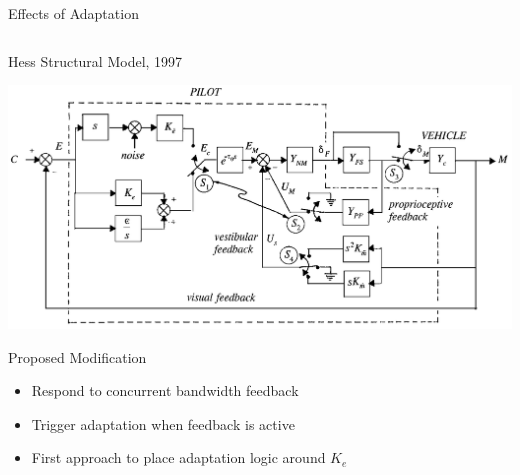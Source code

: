 \documentclass[10pt]{beamer}
\begin{document}
\begin{frame}[fragile]{Effects of Adaptation}
\begin{columns}[T]
\begin{column}{\textwidth}
    \end{column}
  \end{columns}
\end{frame}

\begin{frame}[fragile]{Hess Structural Model, 1997~\cite{Hess1997}}
  \begin{center}
    \includegraphics[width=\linewidth]{../img/Screen_Shot_2018-07-31_at_11.21.44_AM.png}
  \end{center}
\end{frame}

\begin{frame}[fragile]{Proposed Modification}
  \begin{itemize}
    \setlength\itemsep{1em}
    \item Respond to concurrent bandwidth feedback
    \item Trigger adaptation when feedback is active
    \item First approach to place adaptation logic around $K_e$
  \end{itemize}
\end{frame}
\end{document}
